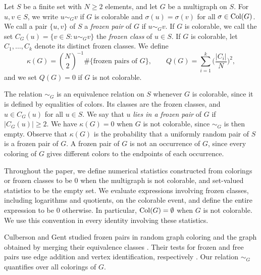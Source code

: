 \begin{definition}\label{def:pre-frozen}
Let $S$ be a finite set with $N \ge 2$ elements, and let $G$ be a multigraph on $S$. For $u, v \in S$, we write $u \sim _G v$ if $G$ is colorable and $\sigma(u) = \sigma(v)$ for all $\sigma \in \operatorname{Col}(G)$. We call a pair $\{u, v\}$ of $S$ a \emph{frozen pair} of $G$ if $u \sim _Gv$. If $G$ is colorable, we call the set $C_G(u) = \{v \in S : u \sim _G v\}$ the \emph{frozen class} of $u \in S$. If $G$ is colorable, let $C_1, \dots, C_k$ denote its distinct frozen classes. We define
\begin{equation}\label{eq:pre-kappa}
\kappa(G) = \binom{N}{2}^{-1} \#\{\text{frozen pairs of } G\}, \qquad Q(G) = \sum_{i = 1}^k \Big(\frac{|C_i|}{N}\Big)^2,
\end{equation}
and we set $Q(G) = 0$ if $G$ is not colorable.
\end{definition}

The relation $\sim _G$ is an equivalence relation on $S$ whenever $G$ is colorable, since it is defined by equalities of colors. Its classes are the frozen classes, and $u \in C_G(u)$ for all $u \in S$. We say that $u$ \emph{lies in a frozen pair} of $G$ if $|C_G(u)| \ge 2$. We have $\kappa(G) = 0$ when $G$ is not colorable, since $\sim _G$ is then empty. Observe that $\kappa(G)$ is the probability that a uniformly random pair of $S$ is a frozen pair of $G$. A frozen pair of $G$ is not an occurrence of $G$, since every coloring of $G$ gives different colors to the endpoints of each occurrence.

Throughout the paper, we define numerical statistics constructed from colorings or frozen classes to be $0$ when the multigraph is not colorable, and set-valued statistics to be the empty set. We evaluate expressions involving frozen classes, including logarithms and quotients, on the colorable event, and define the entire expression to be $0$ otherwise. In particular, $\operatorname{Col}(G) = \emptyset$ when $G$ is not colorable. We use this convention in every identity involving these statistics.

Culberson and Gent studied frozen pairs in random graph coloring and the graph obtained by merging their equivalence classes \cite[Sections~2.1 and~3.2]{culberson2001frozen}. Their tests for frozen and free pairs use edge addition and vertex identification, respectively \cite[Section~2.2]{culberson2001frozen}. Our relation $\sim _G$ quantifies over all colorings of $G$.

